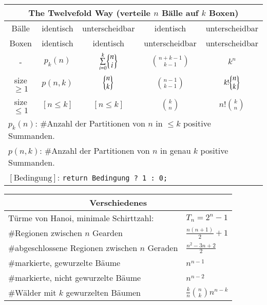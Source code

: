 \begin{tabular}{c|cccc}
	\toprule
	\multicolumn{5}{c}{The Twelvefold Way (verteile $n$ Bälle auf $k$ Boxen)} \\
	\midrule
	Bälle & identisch & unterscheidbar & identisch      & unterscheidbar \\
	Boxen & identisch & identisch      & unterscheidbar & unterscheidbar \\
	\midrule
	- &
	$p_k(n)$ &
	$\sum\limits_{i = 0}^k \biggl\{ \begin{matrix} n \\ i \end{matrix} \biggr\}$ &
	$\binom{n + k - 1}{k - 1}$ &
	$k^n$ \\

	size $\geq 1$ &
	$p(n, k)$ &
	$\biggl\{ \begin{matrix} n \\ k \end{matrix} \biggr\}$ &
	$\binom{n - 1}{k - 1}$ &
	$k! \biggl\{ \begin{matrix} n \\ k \end{matrix} \biggr\}$ \\

	size $\leq 1$ &
	$[n \leq k]$ &
	$[n \leq k]$ &
	$\binom{k}{n}$ &
	$n! \binom{k}{n}$ \\
	\midrule
	\multicolumn{5}{l}{
		$p_k(n)$: \#Anzahl der Partitionen von $n$ in $\leq k$ positive Summanden.
	} \\
	\multicolumn{5}{l}{
		$p(n, k)$: \#Anzahl der Partitionen von $n$ in genau $k$ positive Summanden.
	} \\
	\multicolumn{5}{l}{
		$[\text{Bedingung}]$: \lstinline{return Bedingung ? 1 : 0;}
	} \\
	\bottomrule
\end{tabular}
\vspace{5mm}

\begin{tabular}{ll}
	\toprule
	\multicolumn{2}{c}{Verschiedenes} \\
	\midrule
	Türme von Hanoi, minimale Schirttzahl: &
	$T_n = 2^n - 1$ \\

	\#Regionen zwischen $n$ Gearden	&
	$\frac{n\left(n + 1\right)}{2} + 1$ \\

	\#abgeschlossene Regionen zwischen $n$ Geraden &
	$\frac{n^2 - 3n + 2}{2}$ \\

	\#markierte, gewurzelte Bäume	&
	$n^{n-1}$ \\

	\#markierte, nicht gewurzelte Bäume	&
	$n^{n-2}$ \\

	\#Wälder mit $k$ gewurzelten Bäumen	&
	$\frac{k}{n}\binom{n}{k}n^{n-k}$ \\
	\bottomrule
\end{tabular}
\vspace{5mm}

